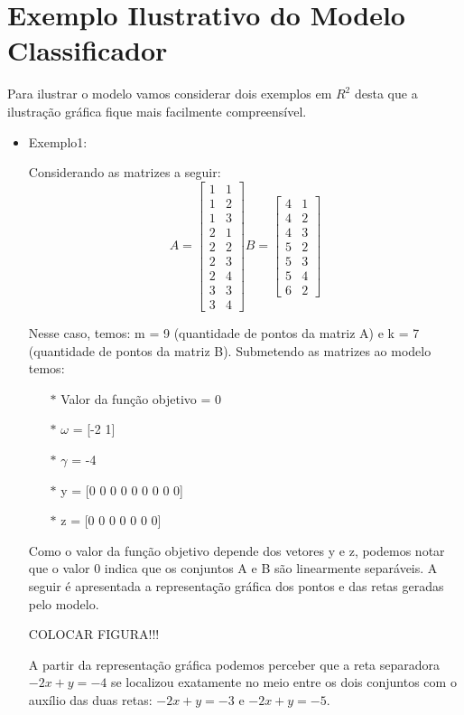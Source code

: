 \section{Exemplo Ilustrativo do Modelo Classificador}
Para ilustrar o modelo vamos considerar dois exemplos em $R^{2}$ \cite{Bennett92robustlinear} desta que a ilustração gráfica fique mais facilmente compreensível.
\begin{itemize}
\item Exemplo1:

Considerando as matrizes a seguir:
$$A=\begin{bmatrix}1 & 1\\ 1 & 2\\ 1 & 3\\ 2 & 1\\ 2 & 2\\ 2 & 3\\ 2 & 4\\ 3 & 3\\ 3 & 4\end{bmatrix}
B=\begin{bmatrix}4 & 1\\ 4 & 2\\ 4 & 3\\ 5 & 2\\ 5 & 3\\ 5 & 4\\ 6 & 2\end{bmatrix}$$

Nesse caso, temos: m = 9 (quantidade de pontos da matriz A) e k = 7 (quantidade de pontos da matriz B).  Submetendo as matrizes ao modelo temos:
\begin{itemize}
\item[$\ast$] Valor da função objetivo = 0
\item[$\ast$] $\omega$ = [-2  1]
\item[$\ast$] $\gamma$ = -4
\item[$\ast$] y = [0 0 0 0 0 0 0 0 0]
\item[$\ast$] z = [0 0 0 0 0 0 0]
\end{itemize}
Como o valor da função objetivo depende dos vetores y e z, podemos notar que o valor 0 indica que os conjuntos A e B são linearmente separáveis. A seguir é apresentada a representação gráfica dos pontos e das retas geradas pelo modelo.

COLOCAR FIGURA!!!

A partir da representação gráfica podemos perceber que a reta separadora $-2x + y = -4$ se localizou exatamente no meio entre os dois conjuntos com o auxílio das duas retas: $-2x + y = -3$ e $-2x + y = -5$.


\end{itemize}
